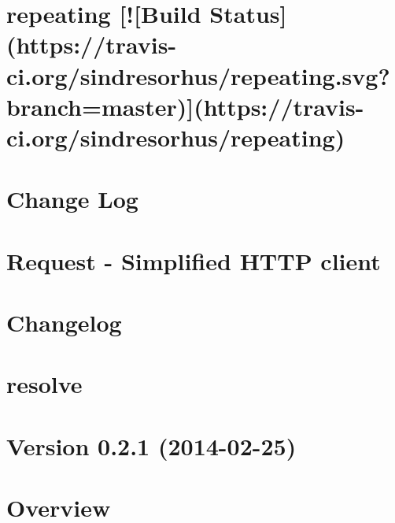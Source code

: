 \documentclass[twoside]{book}
\newcommand{\+}{\discretionary{\mbox{\scriptsize$\hookleftarrow$}}{}{}}
\begin{document}
\chapter{repeating \mbox{[}!\mbox{[}Build Status\mbox{]}(https\+://travis-\/ci.org/sindresorhus/repeating.svg?branch=master)\mbox{]}(https\+://travis-\/ci.org/sindresorhus/repeating)}
\label{md_dsmacc_vis_degree_node_modules_repeating_readme}

\chapter{Change Log}
\label{md_dsmacc_vis_degree_node_modules_request_CHANGELOG}

\chapter{Request -\/ Simplified H\+T\+TP client}
\label{md_dsmacc_vis_degree_node_modules_request_README}

\chapter{Changelog}
\label{md_dsmacc_vis_degree_node_modules_resolve_CHANGELOG}

\chapter{resolve}
\label{md_dsmacc_vis_degree_node_modules_resolve_readme}

\chapter{Version 0.2.1 (2014-\/02-\/25)}
\label{md_dsmacc_vis_degree_node_modules_resolve-url_changelog}

\chapter{Overview}
\label{md_dsmacc_vis_degree_node_modules_resolve-url_readme}

\end{document}
